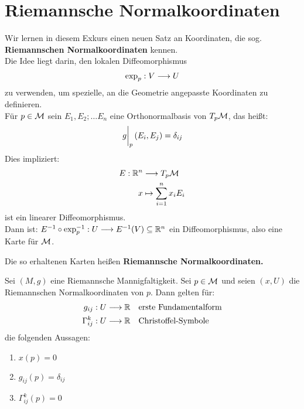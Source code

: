 \section{Riemannsche Normalkoordinaten}
Wir lernen in diesem Exkurs einen neuen Satz an Koordinaten, die sog. \textbf{Riemannschen Normalkoordinaten} kennen. \\
Die Idee liegt darin, den lokalen Diffeomorphismus 
\begin{align*}
\operatorname{exp}_p: V \longrightarrow U
\end{align*}
zu verwenden, um spezielle, an die Geometrie angepasste Koordinaten zu definieren. \\
Für $p \in \mathcal{M}$ sein $E_1, E_2; \dots E_n$ eine Orthonormalbasis von $T_p\mathcal{M}$, das heißt:
\begin{align*}
\eval{g}_{p}(E_i, E_j) = \delta_{ij}
\end{align*} 
Dies impliziert:
\begin{align*}
E: \mathbb{R}^n &\longrightarrow T_p\mathcal{M} \\
x &\mapsto \sum_{i=1}^{n} x_i E_i
\end{align*}
ist ein linearer Diffeomorphismus. \\
Dann ist: $E^{-1} \circ \operatorname{exp}_p^{-1}: U \longrightarrow E^{-1}(V) \subseteq \mathbb{R}^n$ ein Diffeomorphismus, also eine Karte für $\mathcal{M}$. 
\begin{defs}
Die so erhaltenen Karten heißen \textbf{Riemannsche Normalkoordinaten.}
\end{defs}
\begin{satz}
Sei $(M, g)$ eine Riemannsche Mannigfaltigkeit. Sei $p \in \mathcal{M}$ und seien $(x, U)$ die Riemannschen Normalkoordinaten von $p$. Dann gelten für:
\begin{align*}
g_{ij}: U &\longrightarrow \mathbb{R} \quad \text{erste Fundamentalform} \\
\Gamma_{ij}^k:  U &\longrightarrow \mathbb{R} \quad \text{Christoffel-Symbole}
\end{align*}
\newpage
die folgenden Aussagen:
\begin{enumerate}
\item $x(p) = 0$
\item $g_{ij}(p) = \delta_{ij} $
\item $\Gamma_{ij}^k(p) = 0$
\end{enumerate}
\end{satz}
